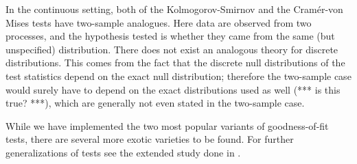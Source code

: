 
In the continuous setting, both of 
the Kolmogorov-Smirnov and the Cram\'{e}r-von Mises tests have two-sample analogues. Here data are
observed from two processes, and the hypothesis tested is 
whether they came from the same (but unspecified) distribution. There
does not exist an analogous theory for discrete distributions. 
This comes from the fact that the discrete null distributions
of the test statistics depend on the exact null distribution; 
therefore the two-sample case would surely have to depend
on the exact distributions used as well (*** is this true? ***), 
which are generally not even stated in the two-sample case. 

While we have implemented the two most popular variants of 
goodness-of-fit tests, there are 
several more exotic varieties to be found. For further 
generalizations of tests see the extended study done in \cite{dewev1973}.


%



\address{Taylor B. Arnold \\
Yale University\\
24 Hillhouse Ave. \\
New Haven, CT 06511
USA\\
}

\address{John W. Emerson \\
Yale University\\
24 Hillhouse Ave. \\
New Haven, CT 06511
USA\\
}

